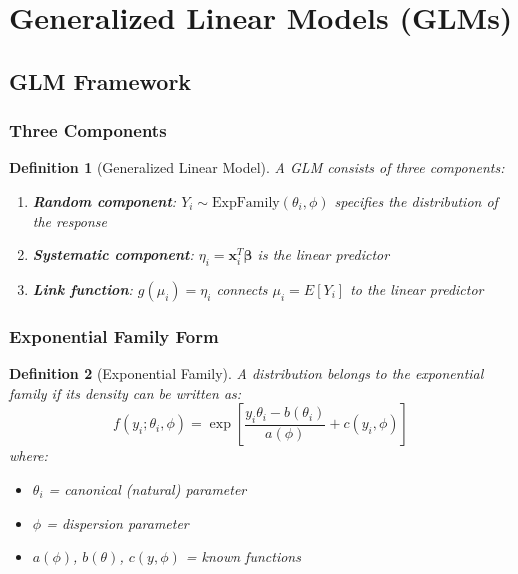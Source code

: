\documentclass{article}
\newtheorem{definition}{Definition}
\begin{document}
\section{Generalized Linear Models (GLMs)}

\subsection{GLM Framework}

\subsubsection{Three Components}

\begin{definition}[Generalized Linear Model]
A GLM consists of three components:
\begin{enumerate}
    \item \textbf{Random component}: $Y_i \sim \text{ExpFamily}(\theta_i, \phi)$ specifies the distribution of the response
    \item \textbf{Systematic component}: $\eta_i = \mathbf{x}_i^T\boldsymbol{\beta}$ is the linear predictor
    \item \textbf{Link function}: $g(\mu_i) = \eta_i$ connects $\mu_i = E[Y_i]$ to the linear predictor
\end{enumerate}
\end{definition}

\subsubsection{Exponential Family Form}

\begin{definition}[Exponential Family]
A distribution belongs to the exponential family if its density can be written as:
\begin{equation}
f(y_i; \theta_i, \phi) = \exp\left[\frac{y_i\theta_i - b(\theta_i)}{a(\phi)} + c(y_i, \phi)\right]
\end{equation}
where:
\begin{itemize}
    \item $\theta_i$ = canonical (natural) parameter
    \item $\phi$ = dispersion parameter
    \item $a(\phi)$, $b(\theta)$, $c(y, \phi)$ = known functions
\end{itemize}
\end{definition}
\end{document}
